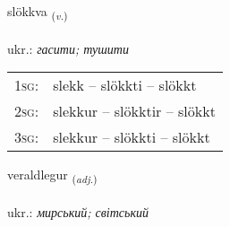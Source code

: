 \documentclass[frontgrid, backgrid]{flacards}\usepackage[]{graphicx}\usepackage[]{xcolor}
\begin{document}
\renewcommand{\flhead}{\vskip5pt \fboxsep=0pt {\small\bfseries\footnotesize Sagnorð | дієслово}}
\renewcommand{\fcfoot}{\vskip5pt \fboxsep=0pt \hspace{2pt}{\small\bfseries\footnotesize 3K}}

\renewcommand{\blhead}{\vskip5pt {\small\bfseries\footnotesize Sagnorð | дієслово }}
\renewcommand{\bcfoot}{\vskip5pt \hspace{2pt}{\small\bfseries\footnotesize 3K}}


{slökkva \small{\textsubscript{(\textit{v.})}} \\[1ex] %
\textphonetic{[stlœhkva]} \\
ukr.: \emph{гасити; тушити} \\  [2ex]
\renewcommand*{\arraystretch}{0.8}
\begin{tabular}{p{1cm}l}
\textsc{1sg}: & slekk -- slökkti -- slökkt \\ 
\textsc{2sg}: & slekkur -- slökktir -- slökkt \\ 
\textsc{3sg}: & slekkur -- slökkti -- slökkt \\ 
\end{tabular}
}

\renewcommand{\flhead}{\vskip5pt \fboxsep=0pt {\small\bfseries\footnotesize Lýsingarorð | прикметник}}
\renewcommand{\fcfoot}{\vskip5pt \fboxsep=0pt \hspace{2pt}{\small\bfseries\footnotesize 3K}}

\renewcommand{\blhead}{\vskip5pt {\small\bfseries\footnotesize Lýsingarorð | прикметник }}
\renewcommand{\bcfoot}{\vskip5pt \hspace{2pt}{\small\bfseries\footnotesize 3K}}


{veraldlegur \small{\textsubscript{(\textit{adj.})}} \\[1ex] %
\textphonetic{[vɛːraltlɛɣʏr]} \\
ukr.: \emph{мирський; світський} \\  [2ex]
\renewcommand*{\arraystretch}{0.8}
}
\end{document}
